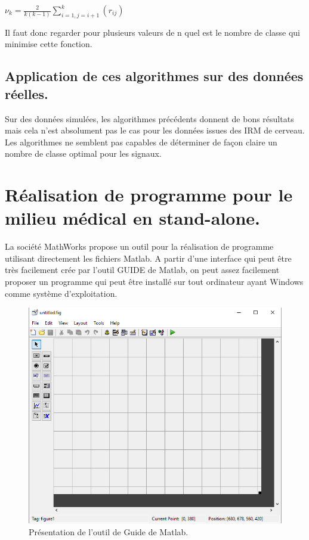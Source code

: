 \medskip

$
\nu_k = \frac{2}{k(k-1)}\sum_{i=1 , j=i+1}^{k}(r_{ij})
$

\medskip

Il faut donc regarder pour plusieurs valeurs de n quel est le nombre de classe qui minimise cette fonction.

\section*{Application de ces algorithmes sur des données réelles.}

Sur des données simulées, les algorithmes précédents donnent de bons résultats mais cela n'est absolument pas le cas pour les données issues des IRM de cerveau. Les algorithmes ne semblent pas capables de déterminer de façon claire un nombre de classe optimal pour les signaux.

\chapter{Réalisation de programme pour le milieu médical en stand-alone.}

La société MathWorks propose un outil pour la réalisation de programme utilisant directement les fichiers Matlab. A partir d'une interface qui peut être très facilement crée par l'outil GUIDE de Matlab, on peut assez facilement proposer un programme qui peut être installé sur tout ordinateur ayant Windows comme système d'exploitation. 

\begin{figure}[H]
\centering
    \includegraphics[scale=0.4,angle=0]{Images/Guide.png}
    \caption{Présentation de l'outil de Guide de Matlab.}
    \label{fig:Guide}
\end{figure} 

